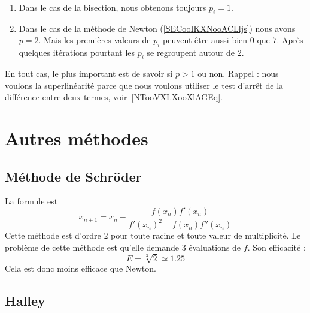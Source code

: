 \begin{enumerate}
    \item
Dans le cas de la bisection, nous obtenons toujours \( p_i=1\).
\item
    Dans le cas de la méthode de Newton (\ref{SECooIKXNooACLljs}) nous avons \( p=2\). Mais les premières valeurs de \( p_i\) peuvent être aussi bien \( 0\) que \( 7\). Après quelques itérations pourtant les \( p_i\) se regroupent autour de \( 2\).
\end{enumerate}
En tout cas, le plus important est de savoir si \( p>1\) ou non. Rappel : nous voulons la superlinéarité parce que nous voulons utiliser le test d'arrêt de la différence entre deux termes, voir~\ref{NTooVXLXooXlAGEq}.

\section{Autres méthodes}

\subsection{Méthode de Schröder}

La formule est
\begin{equation}
    x_{n+1}=x_n-\frac{ f(x_n)f'(x_n) }{ f'(x_n)^2-f(x_n)f''(x_n) }
\end{equation}
Cette méthode est d'ordre \( 2\) pour toute racine et toute valeur de multiplicité. Le problème de cette méthode est qu'elle demande \( 3\) évaluations de \( f\). Son efficacité :
\begin{equation}
    E=\sqrt[3]{ 2 }\simeq 1.25
\end{equation}
Cela est donc moins efficace que Newton.

\subsection{Halley}

